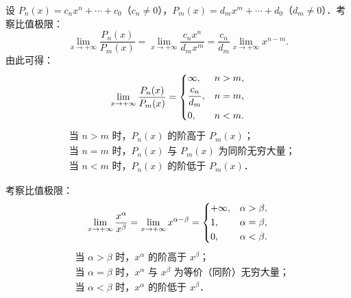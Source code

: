 \begin{solution}

    设 $P_n(x) = c_n x^n + \cdots + c_0$（$c_n \neq 0$），$P_m(x) = d_m x^m + \cdots + d_0$（$d_m \neq 0$）．考察比值极限：
    \begin{equation}
        \lim_{x\to +\infty} \frac{P_n(x)}{P_m(x)} = \lim_{x\to +\infty} \frac{c_n x^n}{d_m x^m} = \frac{c_n}{d_m} \lim_{x\to +\infty} x^{n-m}.
    \end{equation}
    由此可得：
    \begin{equation}
        \lim_{x\to +\infty} \frac{P_n(x)}{P_m(x)} = \begin{dcases} \infty, & n > m, \\ \frac{c_n}{d_m}, & n = m, \\ 0, & n < m. \end{dcases}
    \end{equation}
    \begin{equation}
        \boxed{
            \begin{aligned}
                 & \text{当 } n > m \text{ 时，} P_n(x) \text{ 的阶高于 } P_m(x)\text{；}       \\
                 & \text{当 } n = m \text{ 时，} P_n(x) \text{ 与 } P_m(x) \text{ 为同阶无穷大量；} \\
                 & \text{当 } n < m \text{ 时，} P_n(x) \text{ 的阶低于 } P_m(x)\text{．}
            \end{aligned}
        }
    \end{equation}


    考察比值极限：
    \begin{equation}
        \lim_{x\to +\infty} \frac{x^\alpha}{x^\beta} = \lim_{x\to +\infty} x^{\alpha - \beta} = \begin{dcases} +\infty, & \alpha > \beta, \\ 1, & \alpha = \beta, \\ 0, & \alpha < \beta. \end{dcases}
    \end{equation}
    \begin{equation}
        \boxed{
            \begin{aligned}
                 & \text{当 } \alpha > \beta \text{ 时，} x^\alpha \text{ 的阶高于 } x^\beta\text{；}           \\
                 & \text{当 } \alpha = \beta \text{ 时，} x^\alpha \text{ 与 } x^\beta \text{ 为等价（同阶）无穷大量；} \\
                 & \text{当 } \alpha < \beta \text{ 时，} x^\alpha \text{ 的阶低于 } x^\beta\text{．}
            \end{aligned}
        }
    \end{equation}


\end{solution}
